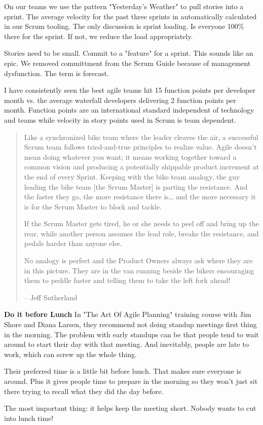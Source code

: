 On our teams we use the pattern "Yesterday's Weather" to pull stories into a sprint. The average velocity for the past three sprints in automatically calculated in our Scrum tooling. The only discussion is sprint loading. Is everyone 100\% there for the sprint. If not, we reduce the load appropriately.

Stories need to be small. Commit to a "feature" for a sprint. This sounds like an epic. We removed committment from the Scrum Guide because of management dysfunction. The term is forecast.

I have consistently seen the best agile teams hit 15 function points per developer month vs. the average waterfall developers delivering 2 function points per month. Function points are an international standard independent of technology and teams while velocity in story points used in Scrum is team dependent. 

\blockquote{Like a synchronized bike team where the leader cleaves the air, a successful Scrum team follows tried-and-true principles to realize value. Agile doesn’t mean doing whatever you want; it means working together toward a common vision and producing a potentially shippable product increment at the end of every Sprint. Keeping with the bike team analogy, the guy leading the bike team  [the Scrum Master] is parting the resistance. And the faster they go, the more resistance there is… and the more necessary it is for the Scrum Master to block and tackle.	

If the Scrum Master gets tired, he or she needs to peel off and bring up the rear, while another person assumes the lead role, breaks the resistance, and pedals harder than anyone else.

No analogy is perfect and the Product Owners always ask where they are in this picture. They are in the van running beside the bikers encouraging them to peddle faster and telling them to take the left fork ahead!

-- Jeff Sutherland
}

\textbf{Do it before Lunch}
In "The Art Of Agile Planning" training course with Jim Shore and Diana Larsen, they recommend not doing standup meetings first thing in the morning.  The problem with early standups can be that people tend to wait around to start their day with that meeting.  And inevitably, people are late to work, which can screw up the whole thing. 

Their preferred time is a little bit before lunch.  That makes sure everyone is around.  Plus it gives people time to prepare in the morning so they won't just sit there trying to recall what they did the day before. 

The most important thing: it helps keep the meeting short.  Nobody wants to cut into lunch time!



